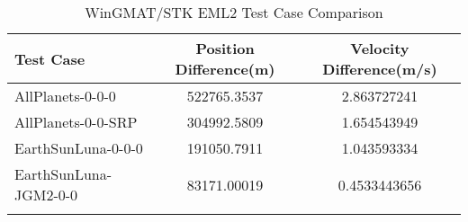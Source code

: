 \begin{table}[htbp!]
\centering
\caption{ WinGMAT/STK EML2 Test Case Comparison}
      \begin{tabular}{lcc}
      \hline\hline
          Test Case & Position Difference(m) & Velocity Difference(m/s) \\
         \hline
         AllPlanets-0-0-0 & 522765.3537 & 2.863727241 \\
         AllPlanets-0-0-SRP & 304992.5809 & 1.654543949 \\
         EarthSunLuna-0-0-0 & 191050.7911 & 1.043593334 \\
         EarthSunLuna-JGM2-0-0 & 83171.00019 & 0.4533443656 \\
      \hline\hline
      \label{Table: EML2 WinGMAT-STK Table} 
\end{tabular}
\end{table}
